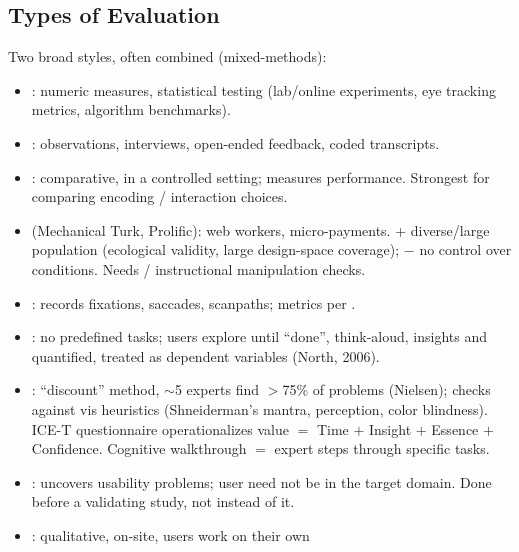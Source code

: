 \subsection{Types of Evaluation}

Two broad styles, often combined (mixed-methods):
\begin{itemize}
  \item {}: numeric measures, statistical testing (lab/online
        experiments, eye tracking metrics, algorithm benchmarks).
  \item {}: observations, interviews, open-ended feedback,
        coded transcripts.
\end{itemize}

\begin{keybox}
\begin{itemize}
  \item {}: comparative, in a controlled
        setting; measures performance. Strongest for comparing encoding /
        interaction choices.
  \item {} (Mechanical Turk, Prolific): web workers,
        micro-payments. + diverse/large population (ecological validity, large
        design-space coverage); $-$ no control over conditions. Needs
         / instructional manipulation checks.
  \item {}: records fixations, saccades, scanpaths;
        metrics per .
  \item {}: no predefined tasks; users explore until
        ``done'', think-aloud, insights  and quantified, treated as
        dependent variables (North, 2006).
  \item {}: ``discount'' method, $\sim$5
        experts find $>$75\% of problems (Nielsen); checks against vis
        heuristics (Shneiderman's mantra, perception, color blindness). ICE-T
        questionnaire operationalizes value $=$ Time $+$ Insight $+$ Essence $+$
        Confidence. Cognitive walkthrough $=$ expert steps through specific tasks.
  \item {}: uncovers usability problems; user need not be in
        the target domain. Done before a validating study, not instead of it.
  \item {}: qualitative, on-site, users work on their own

\end{itemize}
\end{keybox}
